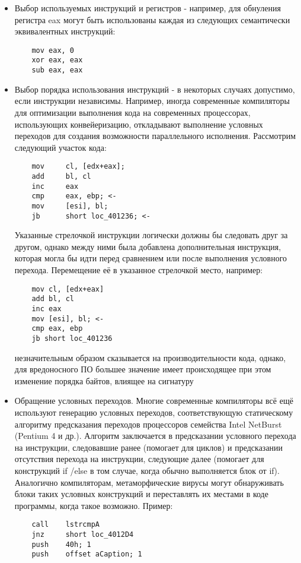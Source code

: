 \begin {itemize}
	\item Выбор используемых инструкций и регистров - например, для обнуления регистра eax могут быть использованы каждая из следующих семантически эквивалентных инструкций:
	\begin{lstlisting}
	mov eax, 0
	xor eax, eax
	sub eax, eax
	\end{lstlisting}
	\item Выбор порядка использования инструкций - в некоторых случаях допустимо, если инструкции независимы. Например, иногда современные компиляторы для оптимизации выполнения кода на современных процессорах, использующих конвейеризацию, откладывают выполнение условных переходов для создания возможности параллельного исполнения. Рассмотрим следующий участок кода:
	\begin{lstlisting}
	mov     cl, [edx+eax];
	add     bl, cl
	inc     eax
	cmp     eax, ebp; <-
	mov     [esi], bl;
	jb      short loc_401236; <-
	\end{lstlisting}
	Указанные стрелочкой инструкции логически должны бы следовать друг за другом, однако между ними была добавлена дополнительная инструкция, которая могла бы идти перед сравнением или после выполнения условного перехода. Перемещение её в указанное стрелочкой место, например:
	\begin{lstlisting}
	mov cl, [edx+eax]
	add bl, cl
	inc eax
	mov [esi], bl; <-
	cmp eax, ebp
	jb short loc_401236
	\end{lstlisting}	
незначительным образом сказывается на производительности кода, однако, для вредоносного ПО большее значение имеет происходящее при этом изменение порядка байтов, влиящее на сигнатуру
	\item Обращение условных переходов. Многие современные компиляторы всё ещё используют генерацию условных переходов, соответствующую статическому алгоритму предсказания переходов процессоров семейства Intel NetBurst (Pentium 4 и др.)\cite{INTELMANUAL}. Алгоритм заключается в предсказании условного перехода на инструкции, следовавшие ранее (помогает для циклов) и предсказании отсутствия перехода на инструкции, следующие далее (помогает для конструкций if /else в том случае, когда обычно выполняется блок от if). Аналогично компиляторам, метаморфические вирусы могут обнаруживать блоки таких условных конструкций и переставлять их местами в коде программы, когда такое возможно. Пример:
	\begin{lstlisting}
	call    lstrcmpA
	jnz     short loc_4012D4
	push    40h; 1
	push    offset aCaption; 1

\end{lstlisting}
\end{itemize}
